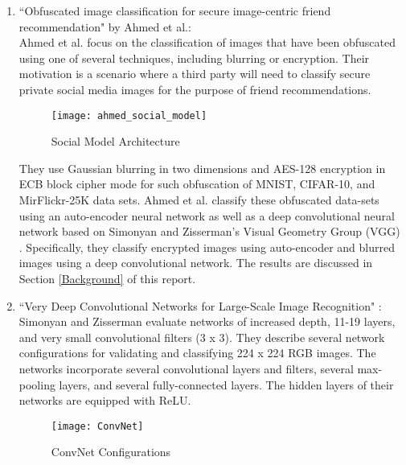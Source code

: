 \documentclass[12pt, titlepage]{article}
\begin{document}
\begin{enumerate}
	\item ``Obfuscated image classification for secure image-centric friend recommendation" by Ahmed et al.\citep{ahmed2018obfuscated}:\\
	
	Ahmed et al. focus on the classification of images that have been obfuscated using one of several techniques, including blurring or encryption. Their motivation is a scenario where a third party will need to classify secure private social media images for the purpose of friend recommendations. 
	
	\begin{figure}[h!]
		\begin{center}
			\texttt{[image: ahmed\_social\_model]}
			\caption{Social Model Architecture}
			\label{Ahmed_social_model}
		\end{center}
	\end{figure}
	
	
	They use Gaussian blurring in two dimensions and AES-128 encryption in ECB block cipher mode for such obfuscation of MNIST, CIFAR-10, and MirFlickr-25K data sets. Ahmed et al. classify these obfuscated data-sets using an auto-encoder neural network as well as a deep convolutional neural network based on Simonyan and Zisserman's Visual Geometry Group (VGG) \cite{simonyan2014very}. Specifically, they classify encrypted images using auto-encoder and blurred images using a deep convolutional network. 
	The results are discussed in Section \ref{Background} of this report. \\
	
	\item ``Very Deep Convolutional Networks for Large-Scale Image Recognition"
	\citep{simonyan2014very}:
	Simonyan and Zisserman evaluate networks of increased depth, 11-19 layers, and very small convolutional filters (3 x 3). They describe several network configurations for validating and classifying 224 x 224 RGB images. The networks incorporate several convolutional layers and filters, several max-pooling layers, and several fully-connected layers. The hidden layers of their networks are equipped with ReLU.
	
	\begin{figure}[h!]
		\begin{center}
			\texttt{[image: ConvNet]}
			\caption{ConvNet Configurations}
			\label{ConvNet}
		\end{center}
	\end{figure}
	

\end{enumerate}
\end{document}
